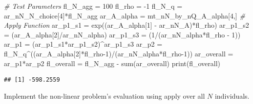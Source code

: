 \documentclass[
]{book}
\newenvironment{Shaded}{\begin{snugshade}}{\end{snugshade}}
\newcommand{\CommentTok}[1]{\textcolor[rgb]{0.56,0.35,0.01}{\textit{#1}}}
\newcommand{\DecValTok}[1]{\textcolor[rgb]{0.00,0.00,0.81}{#1}}
\newcommand{\FunctionTok}[1]{\textcolor[rgb]{0.00,0.00,0.00}{#1}}
\newcommand{\NormalTok}[1]{#1}
\newcommand{\OtherTok}[1]{\textcolor[rgb]{0.56,0.35,0.01}{#1}}
\newcommand{\SpecialCharTok}[1]{\textcolor[rgb]{0.00,0.00,0.00}{#1}}
\begin{document}
\begin{Shaded}
\begin{Highlighting}[]
\CommentTok{\# Test Parameters}
\NormalTok{fl\_N\_agg }\OtherTok{=} \DecValTok{100}
\NormalTok{fl\_rho }\OtherTok{=} \SpecialCharTok{{-}}\DecValTok{1}
\NormalTok{fl\_N\_q }\OtherTok{=}\NormalTok{ ar\_nN\_N\_choice[}\DecValTok{4}\NormalTok{]}\SpecialCharTok{*}\NormalTok{fl\_N\_agg}
\NormalTok{ar\_A\_alpha }\OtherTok{=}\NormalTok{ mt\_nN\_by\_nQ\_A\_alpha[}\DecValTok{4}\NormalTok{,]}
\CommentTok{\# Apply Function}
\NormalTok{ar\_p1\_s1 }\OtherTok{=} \FunctionTok{exp}\NormalTok{((ar\_A\_alpha[}\DecValTok{1}\NormalTok{] }\SpecialCharTok{{-}}\NormalTok{ ar\_nN\_A)}\SpecialCharTok{*}\NormalTok{fl\_rho)}
\NormalTok{ar\_p1\_s2 }\OtherTok{=}\NormalTok{ (ar\_A\_alpha[}\DecValTok{2}\NormalTok{]}\SpecialCharTok{/}\NormalTok{ar\_nN\_alpha)}
\NormalTok{ar\_p1\_s3 }\OtherTok{=}\NormalTok{ (}\DecValTok{1}\SpecialCharTok{/}\NormalTok{(ar\_nN\_alpha}\SpecialCharTok{*}\NormalTok{fl\_rho }\SpecialCharTok{{-}} \DecValTok{1}\NormalTok{))}
\NormalTok{ar\_p1 }\OtherTok{=}\NormalTok{ (ar\_p1\_s1}\SpecialCharTok{*}\NormalTok{ar\_p1\_s2)}\SpecialCharTok{\^{}}\NormalTok{ar\_p1\_s3}
\NormalTok{ar\_p2 }\OtherTok{=}\NormalTok{ fl\_N\_q}\SpecialCharTok{\^{}}\NormalTok{((ar\_A\_alpha[}\DecValTok{2}\NormalTok{]}\SpecialCharTok{*}\NormalTok{fl\_rho}\DecValTok{{-}1}\NormalTok{)}\SpecialCharTok{/}\NormalTok{(ar\_nN\_alpha}\SpecialCharTok{*}\NormalTok{fl\_rho}\DecValTok{{-}1}\NormalTok{))}
\NormalTok{ar\_overall }\OtherTok{=}\NormalTok{ ar\_p1}\SpecialCharTok{*}\NormalTok{ar\_p2}
\NormalTok{fl\_overall }\OtherTok{=}\NormalTok{ fl\_N\_agg }\SpecialCharTok{{-}} \FunctionTok{sum}\NormalTok{(ar\_overall)}
\FunctionTok{print}\NormalTok{(fl\_overall)}
\end{Highlighting}
\end{Shaded}

\begin{verbatim}
## [1] -598.2559
\end{verbatim}

Implement the non-linear problem's evaluation using apply over all \(N\) individuals.
\end{document}
